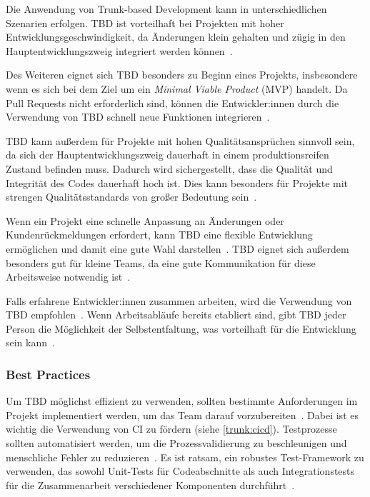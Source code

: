Die Anwendung von Trunk-based Development kann in unterschiedlichen Szenarien erfolgen. TBD ist vorteilhaft bei Projekten mit hoher Entwicklungsgeschwindigkeit, da Änderungen klein gehalten und zügig in den Hauptentwicklungszweig integriert werden können~\cite{trunkbased1}.

Des Weiteren eignet sich TBD besonders zu Beginn eines Projekts, insbesondere wenn es sich bei dem Ziel um ein \emph{Minimal Viable Product} (MVP) handelt. Da Pull Requests nicht erforderlich sind, können die Entwickler:innen durch die Verwendung von TBD schnell neue Funktionen integrieren~\cite{trunkbased6}.

TBD kann außerdem für Projekte mit hohen Qualitätsansprüchen sinnvoll sein, da sich der Hauptentwicklungszweig dauerhaft in einem produktionsreifen Zustand befinden muss. Dadurch wird sichergestellt, dass die Qualität und Integrität des Codes dauerhaft hoch ist. Dies kann besonders für Projekte mit strengen Qualitätsstandards von großer Bedeutung sein~\cite{trunkbased1}.

Wenn ein Projekt eine schnelle Anpassung an Änderungen oder Kundenrückmeldungen erfordert, kann TBD eine flexible Entwicklung ermöglichen und damit eine gute Wahl darstellen~\cite{trunkbased6}. TBD eignet sich außerdem besonders gut für kleine Teams, da eine gute Kommunikation für diese Arbeitsweise notwendig ist~\cite{trunkbased1}.

Falls erfahrene Entwickler:innen zusammen arbeiten, wird die Verwendung von TBD empfohlen~\cite{Gadzinowski_trunk-based_nodate}. Wenn Arbeitsabläufe bereits etabliert sind, gibt TBD jeder Person die Möglichkeit der Selbstentfaltung, was vorteilhaft für die Entwicklung sein kann~\cite{Gadzinowski_trunk-based_nodate}.

\subsubsection{Best Practices}
\label{trunk:bestprac}

Um TBD möglichst effizient zu verwenden, sollten bestimmte Anforderungen im Projekt implementiert werden, um das Team darauf vorzubereiten~\cite{trunkbased_bestpractice1}. Dabei ist es wichtig die Verwendung von CI zu fördern (siehe \autoref{trunk:cicd}). Testprozesse sollten automatisiert werden, um die Prozessvalidierung zu beschleunigen und menschliche Fehler zu reduzieren~\cite{trunkbased_bestpractice1}. Es ist ratsam, ein robustes Test\hyp Framework zu verwenden, das sowohl Unit\hyp Tests für Codeabschnitte als auch Integrationstests für die Zusammenarbeit verschiedener Komponenten durchführt~\cite{trunkbased_bestpractice1}.

